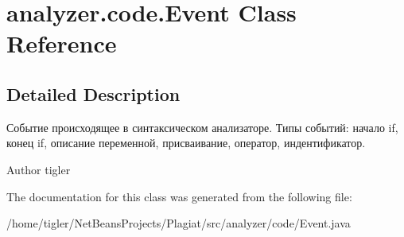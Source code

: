 \hypertarget{classanalyzer_1_1code_1_1Event}{}\section{analyzer.\+code.\+Event Class Reference}
\label{classanalyzer_1_1code_1_1Event}


\subsection{Detailed Description}
Событие происходящее в синтаксическом анализаторе. Типы событий\+: начало if, конец if, описание переменной, присваивание, оператор, индентификатор. \begin{DoxyAuthor}{Author}
tigler 
\end{DoxyAuthor}


The documentation for this class was generated from the following file\+:\begin{DoxyCompactItemize}
\item 
/home/tigler/\+Net\+Beans\+Projects/\+Plagiat/src/analyzer/code/Event.\+java\end{DoxyCompactItemize}
